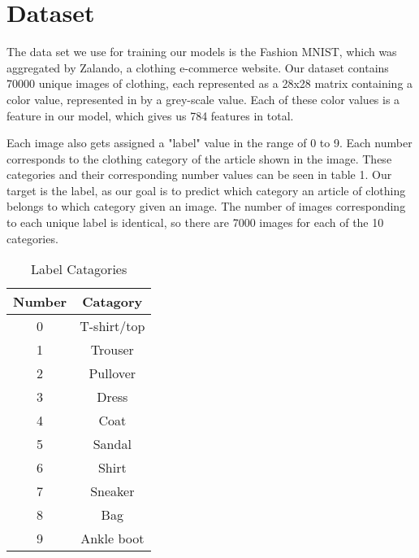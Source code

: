\section{Dataset}
\label{sec:dataset}
The data set we use for training our models is the Fashion MNIST, which was aggregated by Zalando, a clothing e-commerce website. Our dataset contains 70000 unique images of clothing, each represented as a 28x28 matrix containing a color value, represented in by a grey-scale value. Each of these color values is a feature in our model, which gives us 784 features in total.

 Each image also gets assigned a "label" value in the range of 0 to 9. Each number corresponds to the clothing category of the article shown in the image. These categories and their corresponding number values can be seen in table 1. Our target is the label, as our goal is to predict which category an article of clothing belongs to which category given an image. The number of images corresponding to each unique label is identical, so there are 7000 images for each of the 10 categories.

\begin{table}[!h]
    \centering
    \begin{tabular}{|c|c|}
        \hline
        Number & Catagory\\
        \hline
        0 & T-shirt/top\\
        1 & Trouser\\
        2 & Pullover\\
        3 & Dress\\
        4 & Coat\\
        5 & Sandal\\
        6 & Shirt\\
        7 & Sneaker\\
        8 & Bag\\
        9 & Ankle boot\\
        \hline
    \end{tabular}
    \caption{Label Catagories}
    \label{tab:my_label}
\end{table}